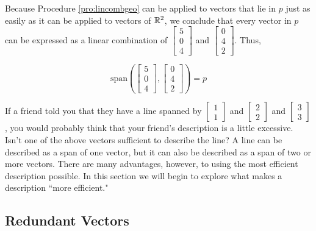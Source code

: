 \documentclass{ximera}
\begin{document}
\begin{example}
\begin{explanation}
Because Procedure \ref{pro:lincombgeo} can be applied to vectors that lie in $p$ just as easily as it can be applied to vectors of $\mathbb{R}^2$, we conclude that every vector in $p$ can be expressed as a linear combination of $\begin{bmatrix}5\\0\\4\end{bmatrix}$ and  $\begin{bmatrix}0\\4\\2\end{bmatrix}$.  Thus, 

$$\mbox{span}\left(\begin{bmatrix}5\\0\\4\end{bmatrix}, \begin{bmatrix}0\\4\\2\end{bmatrix}\right)=p$$

\end{explanation}
\end{example}

If a friend told you that they have a line spanned by $\begin{bmatrix}1\\1\end{bmatrix}$ and $\begin{bmatrix}2\\2\end{bmatrix}$ and $\begin{bmatrix}3\\3\end{bmatrix}$, you would probably think that your friend's description is a little excessive.  Isn't one of the above vectors sufficient to describe the line?  A line can be described as a span of one vector, but it can also be described as a span of two or more vectors.  There are many advantages, however, to using the most efficient description possible.  In this section we will begin to explore what makes a description ``more efficient."
\subsection*{Redundant Vectors}
\end{document}
